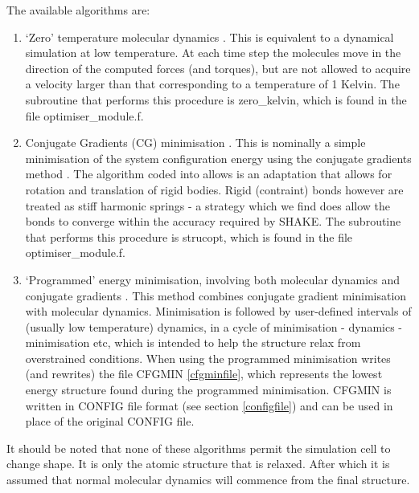 The available algorithms are:
\begin{enumerate}
\item `Zero' temperature molecular dynamics 
      . This is equivalent 
      to a dynamical simulation at
      low temperature. At each time step the molecules move in the
      direction of the computed forces (and torques), but are not
      allowed to acquire a velocity larger than that corresponding to
      a temperature of 1 Kelvin. The subroutine that performs this
      procedure is {\sc zero\_kelvin}, which is found in the file {\sc
      optimiser\_module.f}.

\item Conjugate Gradients (CG) minimisation 
      . This is nominally a 
      simple minimisation of the system
      configuration energy using the conjugate gradients method
      \cite{shewchuk-94a}. The algorithm coded into \D{} allows is an adaptation
      that allows for rotation and translation of rigid bodies. Rigid
      (contraint) bonds however are treated as stiff harmonic springs - a
      strategy which we find does allow the bonds to converge within the
      accuracy required by SHAKE. The subroutine that performs this procedure
      is {\sc strucopt}, which is found in the file {\sc optimiser\_module.f}.
\item `Programmed' energy minimisation, involving both molecular 
      dynamics and conjugate gradients
      .  This method combines conjugate
      gradient minimisation with molecular dynamics. Minimisation is
      followed by user-defined intervals of (usually low temperature)
      dynamics, in a cycle of minimisation - dynamics - minimisation
      etc, which is intended to help the structure relax from
      overstrained conditions. When using the programmed minimisation
      \D{} writes (and rewrites) the file CFGMIN \ref{cfgminfile}, which
      represents the lowest energy structure found during the
      programmed minimisation. CFGMIN is written in CONFIG file format
      (see section \ref{configfile}) and can be used in place of the
      original CONFIG file.
\end{enumerate}

It should be noted that none of these algorithms permit the simulation
cell to change shape. It is only the atomic structure that is relaxed.
After which it is assumed that normal molecular dynamics will commence
from the final structure.

